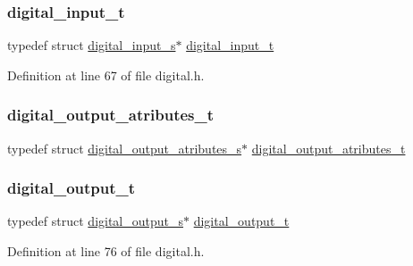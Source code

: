 \mbox{\label{group__hal_gaa88780f43e331bbd1d6069d75ad68fcf}} 
\subsubsection{\texorpdfstring{digital\+\_\+input\+\_\+t}{digital\_input\_t}}
{\footnotesize\ttfamily typedef struct \hyperlink{structdigital__input__s}{digital\+\_\+input\+\_\+s}$\ast$ \hyperlink{group__hal_gaa88780f43e331bbd1d6069d75ad68fcf}{digital\+\_\+input\+\_\+t}}



Definition at line 67 of file digital.\+h.

\mbox{\label{group__hal_ga52de0d94c690b3251abf626bc86dfed9}} 
\subsubsection{\texorpdfstring{digital\+\_\+output\+\_\+atributes\+\_\+t}{digital\_output\_atributes\_t}}
{\footnotesize\ttfamily typedef struct \hyperlink{structdigital__output__atributes__s}{digital\+\_\+output\+\_\+atributes\+\_\+s}$\ast$  \hyperlink{group__hal_ga52de0d94c690b3251abf626bc86dfed9}{digital\+\_\+output\+\_\+atributes\+\_\+t}}

\mbox{\label{group__hal_ga3e63b19d3d0dbfbfb2c50b3ac1f69aa0}} 
\subsubsection{\texorpdfstring{digital\+\_\+output\+\_\+t}{digital\_output\_t}}
{\footnotesize\ttfamily typedef struct \hyperlink{structdigital__output__s}{digital\+\_\+output\+\_\+s}$\ast$ \hyperlink{group___plantilla_ga3e63b19d3d0dbfbfb2c50b3ac1f69aa0}{digital\+\_\+output\+\_\+t}}



Definition at line 76 of file digital.\+h.

